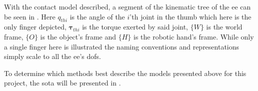 With the contact model described, a segment of the kinematic tree of the \gls{ee} can be seen in . Here $q_{thi}$ is the angle of the $i$'th joint in the thumb which here is the only finger depicted, $\boldsymbol{\tau}_{thi}$ is the torque exerted by said joint, $\{W\}$ is the world frame, $\{O\}$ is the object's frame and $\{H\}$ is the robotic hand's frame. While only a single finger here is illustrated the naming conventions and representations simply scale to all the \gls{ee}'s \gls{dof}s.\medskip

To determine which methods best describe the models presented above for this project, the \gls{sota} will be presented in .

